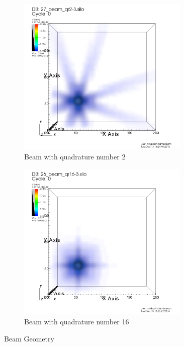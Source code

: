 \documentclass[10pt]{article}
\begin{document}
\begin{figure}[!ht]
\centering
\begin{subfigure}{0.49\textwidth}
\centering
\includegraphics[width = 0.9\textwidth]{visit/visit-beam-02}
\caption{Beam with quadrature number 2}
\label{visit:beam-02}
\end{subfigure}
\hfill
\begin{subfigure}{0.49\textwidth}
\centering
\includegraphics[width = 0.9\textwidth]{visit/visit-beam-16}
\caption{Beam with quadrature number 16}
\label{visit:beam-16}
\end{subfigure}
\caption{Beam Geometry}
\label{visit:beam}
\end{figure}
\end{document}
